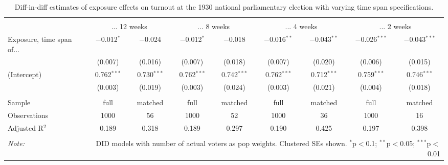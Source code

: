 
\begin{table}[!htbp] \centering 
  \caption{Diff-in-diff estimates of exposure effects on turnout at the 1930 national parliamentary election with varying time span specifications.\vspace{-.25cm}} 
  \label{tab:nsdap-turnout-timespan-dd-1930} 
\scriptsize 
\begin{tabular}{@{\extracolsep{5pt}}lcccccccc} 
\\[-1.8ex]\hline 
\hline \\[-1.8ex] 
 & \multicolumn{2}{c}{... 12 weeks} & \multicolumn{2}{c}{... 8 weeks} & \multicolumn{2}{c}{... 4 weeks} & \multicolumn{2}{c}{... 2 weeks} \\ 
 \cmidrule(r){2-3}\cmidrule(r){4-5}\cmidrule(r){6-7}\cmidrule(r){8-9}Exposure, time span of... & $-$0.012$^{*}$ & $-$0.024 & $-$0.012$^{*}$ & $-$0.018 & $-$0.016$^{**}$ & $-$0.043$^{**}$ & $-$0.026$^{***}$ & $-$0.043$^{***}$ \\ 
  & (0.007) & (0.016) & (0.007) & (0.018) & (0.007) & (0.020) & (0.006) & (0.015) \\ 
  (Intercept) & 0.762$^{***}$ & 0.730$^{***}$ & 0.762$^{***}$ & 0.742$^{***}$ & 0.762$^{***}$ & 0.712$^{***}$ & 0.759$^{***}$ & 0.746$^{***}$ \\ 
  & (0.003) & (0.019) & (0.003) & (0.024) & (0.003) & (0.021) & (0.004) & (0.018) \\ 
 \hline \\[-1.8ex] 
Sample & full & matched & full & matched & full & matched & full & matched \\ 
Observations & 1000 & 56 & 1000 & 52 & 1000 & 36 & 1000 & 16 \\ 
Adjusted R$^{2}$ & 0.189 & 0.318 & 0.189 & 0.297 & 0.190 & 0.425 & 0.197 & 0.398 \\ 
\hline 
\hline \\[-1.8ex] 
\textit{Note:}  & \multicolumn{8}{r}{DID models with number of actual voters as pop weights. Clustered SEs shown. $^{*}$p$<$0.1; $^{**}$p$<$0.05; $^{***}$p$<$0.01} \\ 
\end{tabular} 
\end{table} 
